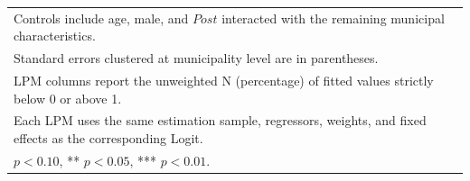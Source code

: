 \begin{table}[!htbp]
{\begin{tabular}{lcccccccc}
\multicolumn{9}{l}{\footnotesize Controls include age, male, and \(Post\) interacted with the remaining municipal characteristics.} \\
\multicolumn{9}{l}{\footnotesize Standard errors clustered at municipality level are in parentheses.} \\
\multicolumn{9}{l}{\footnotesize LPM columns report the unweighted N (percentage) of fitted values strictly below 0 or above 1.} \\
\multicolumn{9}{l}{\footnotesize Each LPM uses the same estimation sample, regressors, weights, and fixed effects as the corresponding Logit.} \\
\multicolumn{9}{l}{\footnotesize * \(p<0.10\), ** \(p<0.05\), *** \(p<0.01\).} \\
\end{tabular}
}
\end{table}
